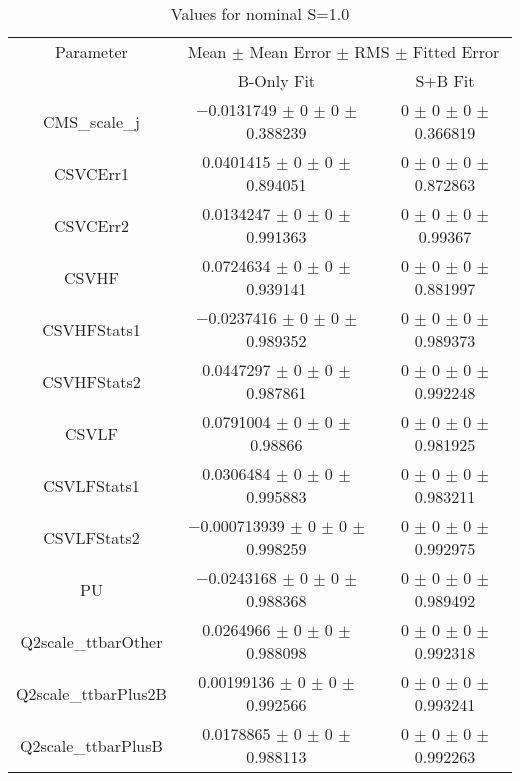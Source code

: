 \begin{table}
\centering
\caption{Values for nominal S=1.0}
\begin{tabular}{ccc}
\toprule
Parameter & \multicolumn{2}{c}{Mean $\pm$ Mean Error $\pm$ RMS $\pm$ Fitted Error}\\
 & B-Only Fit & S+B Fit\\
\midrule
CMS\_scale\_j & \num{-0.0131749} $\pm$ \num{0} $\pm$ \num{0} $\pm$ \num{0.388239} & \num{0} $\pm$ \num{0} $\pm$ \num{0} $\pm$ \num{0.366819}\\
CSVCErr1 & \num{0.0401415} $\pm$ \num{0} $\pm$ \num{0} $\pm$ \num{0.894051} & \num{0} $\pm$ \num{0} $\pm$ \num{0} $\pm$ \num{0.872863}\\
CSVCErr2 & \num{0.0134247} $\pm$ \num{0} $\pm$ \num{0} $\pm$ \num{0.991363} & \num{0} $\pm$ \num{0} $\pm$ \num{0} $\pm$ \num{0.99367}\\
CSVHF & \num{0.0724634} $\pm$ \num{0} $\pm$ \num{0} $\pm$ \num{0.939141} & \num{0} $\pm$ \num{0} $\pm$ \num{0} $\pm$ \num{0.881997}\\
CSVHFStats1 & \num{-0.0237416} $\pm$ \num{0} $\pm$ \num{0} $\pm$ \num{0.989352} & \num{0} $\pm$ \num{0} $\pm$ \num{0} $\pm$ \num{0.989373}\\
CSVHFStats2 & \num{0.0447297} $\pm$ \num{0} $\pm$ \num{0} $\pm$ \num{0.987861} & \num{0} $\pm$ \num{0} $\pm$ \num{0} $\pm$ \num{0.992248}\\
CSVLF & \num{0.0791004} $\pm$ \num{0} $\pm$ \num{0} $\pm$ \num{0.98866} & \num{0} $\pm$ \num{0} $\pm$ \num{0} $\pm$ \num{0.981925}\\
CSVLFStats1 & \num{0.0306484} $\pm$ \num{0} $\pm$ \num{0} $\pm$ \num{0.995883} & \num{0} $\pm$ \num{0} $\pm$ \num{0} $\pm$ \num{0.983211}\\
CSVLFStats2 & \num{-0.000713939} $\pm$ \num{0} $\pm$ \num{0} $\pm$ \num{0.998259} & \num{0} $\pm$ \num{0} $\pm$ \num{0} $\pm$ \num{0.992975}\\
PU & \num{-0.0243168} $\pm$ \num{0} $\pm$ \num{0} $\pm$ \num{0.988368} & \num{0} $\pm$ \num{0} $\pm$ \num{0} $\pm$ \num{0.989492}\\
Q2scale\_ttbarOther & \num{0.0264966} $\pm$ \num{0} $\pm$ \num{0} $\pm$ \num{0.988098} & \num{0} $\pm$ \num{0} $\pm$ \num{0} $\pm$ \num{0.992318}\\
Q2scale\_ttbarPlus2B & \num{0.00199136} $\pm$ \num{0} $\pm$ \num{0} $\pm$ \num{0.992566} & \num{0} $\pm$ \num{0} $\pm$ \num{0} $\pm$ \num{0.993241}\\
Q2scale\_ttbarPlusB & \num{0.0178865} $\pm$ \num{0} $\pm$ \num{0} $\pm$ \num{0.988113} & \num{0} $\pm$ \num{0} $\pm$ \num{0} $\pm$ \num{0.992263}\\

\end{tabular}
\end{table}
